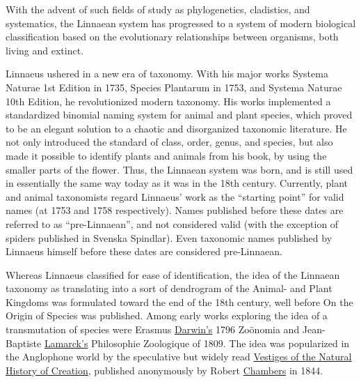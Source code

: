 With the advent of such fields of study as phylogenetics, cladistics,
and systematics, the Linnaean system has progressed to a system of
modern biological classification based on the evolutionary relationships
between organisms, both living and extinct.

Linnaeus ushered in a new era of taxonomy. With his major works
Systema Naturae 1st Edition in 1735, Species Plantarum in 1753, and
Systema Naturae 10th Edition, he revolutionized modern taxonomy. His
works implemented a standardized binomial naming system for animal and
plant species, which proved to be an elegant solution to a chaotic and
disorganized taxonomic literature. He not only introduced the standard
of class, order, genus, and species, but also made it possible to
identify plants and animals from his book, by using the smaller parts of
the flower. Thus, the Linnaean system was born, and is still used in
essentially the same way today as it was in the 18th century. Currently,
plant and animal taxonomists regard Linnaeus' work as the ``starting
point'' for valid names (at 1753 and 1758 respectively). Names published
before these dates are referred to as ``pre-Linnaean'', and not
considered valid (with the exception of spiders published in Svenska
Spindlar). Even taxonomic names published by Linnaeus himself before
these dates are considered pre-Linnaean.

Whereas Linnaeus classified for ease of identification, the idea of the
Linnaean taxonomy as translating into a sort of dendrogram of the
Animal- and Plant Kingdoms was formulated toward the end of the 18th
century, well before On the Origin of Species was published. Among early
works exploring the idea of a transmutation of species were Erasmus \href{https://en.wikipedia.org/wiki/Erasmus_Darwin}{Darwin's} 1796 Zoönomia and Jean-Baptiste \href{https://en.wikipedia.org/wiki/Jean-Baptiste_Lamarck}{Lamarck's} Philosophie
Zoologique of 1809. The idea was popularized in the Anglophone world by
the speculative but widely read \href{https://en.wikipedia.org/wiki/Vestiges_of_the_Natural_History_of_Creation}{Vestiges of the Natural History of
Creation}, published anonymously by Robert \href{https://en.wikipedia.org/wiki/Robert_Chambers_(publisher,_born_1802)}{Chambers} in 1844.

